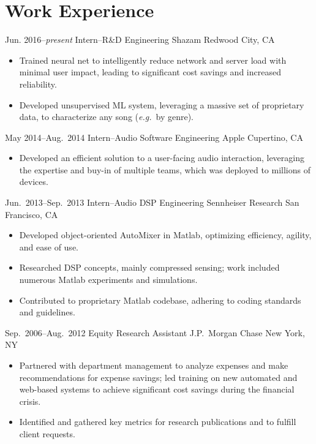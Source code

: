 \documentclass[10pt,letterpaper,roman,final]{moderncv}
\begin{document}
\section{Work Experience} %

\cventry
{Jun. 2016--\textit{present}}
{Intern--R\&D Engineering}
{Shazam}
{Redwood City, CA}
{}
{\begin{itemize}
   \item Trained neural net to intelligently reduce network and server load
         with minimal user impact, leading to significant cost savings and
         increased reliability.
   \item Developed unsupervised ML system, leveraging a massive
         set of proprietary data, to characterize any song (\textit{e.g.}\ by
         genre).
 \end{itemize}}

\cventry
{May 2014--Aug.\ 2014}
{Intern--Audio Software Engineering}
{Apple}
{Cupertino, CA}
{}
{\begin{itemize}
   \item Developed an efficient solution to a user-facing audio
         interaction, leveraging the expertise and buy-in of multiple teams,
         which was deployed to millions of devices.
 \end{itemize}}

\cventry
{Jun.\ 2013--Sep.\ 2013}
{Intern--Audio DSP Engineering}
{Sennheiser Research}
{San Francisco, CA}
{}
{\begin{itemize}
   \item Developed object-oriented AutoMixer in Matlab, optimizing efficiency,
         agility, and ease of use.
   \item Researched DSP concepts, mainly compressed sensing; work included
         numerous Matlab experiments and simulations.
   \item Contributed to proprietary Matlab codebase, adhering to coding
         standards and guidelines.
 \end{itemize}}

\cventry
{Sep.\ 2006--Aug.\ 2012}
{Equity Research Assistant}
{J.P.\ Morgan Chase}
{New York, NY}
{}
{\begin{itemize}
   \item Partnered with department management to analyze expenses and make
         recommendations for expense savings; led training on new automated and
         web-based systems to achieve significant cost savings during the
         financial crisis.
   \item Identified and gathered key metrics for research publications and to
         fulfill client requests.
 \end{itemize}}
\end{document}
